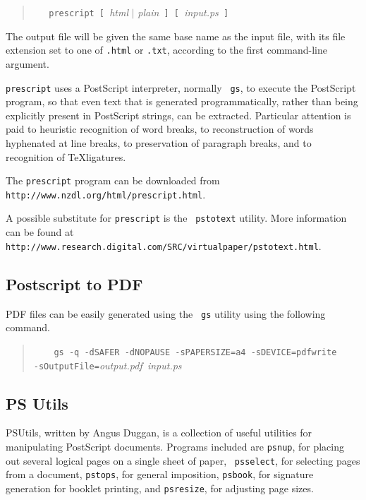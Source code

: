 \documentclass[twoside,11pt]{article}
\newcommand{\htmladdnormallink}[2]{#1}
\newcommand{\htmlref}[2]{#1}
\newcommand{\latex}[1]{#1}
\newcommand{\xlabel}[1]{}
\begin{document}
\begin{quote}
\verb+   prescript [ +{\em html} $\mid$ {\em plain}\verb+ ] [ +{\em input.ps}\verb+ ]+
\end{quote}

The output file will be given the same base name as the input file,
with its file extension set to one of {\tt .html} or {\tt .txt},
according to the first command-line argument. 

{\tt prescript} uses a PostScript interpreter, normally \htmlref{{\tt
gs}}{sc15_gs}, to execute the PostScript program, so that even text
that is generated programmatically, rather than being explicitly
present in PostScript strings, can be extracted. Particular attention
is paid to heuristic recognition of word breaks, to reconstruction of
words hyphenated at line breaks, to preservation of paragraph breaks,
and to recognition of \TeX ligatures. 

The {\tt prescript} program can be downloaded from
\htmladdnormallink{{\tt
http://www.nzdl.org/html/prescript.html}}{http://www.nzdl.org/html/prescript.html}.

A possible substitute for {\tt prescript} is the
\htmladdnormallink{{\tt
pstotext}}{http://www.research.digital.com/SRC/virtualpaper/pstotext.html}
utility. \latex{ More information can be found at {\tt
http://www.research.digital.com/SRC/virtualpaper/pstotext.html}.} 

\subsection{\xlabel{sc15_pstopdf}Postscript to PDF\label{sc15_pstopdf}}

PDF files can be easily generated using the \htmlref{{\tt
gs}}{sc15_gs} utility using the following command.

\begin{quote}
\verb+    gs -q -dSAFER -dNOPAUSE -sPAPERSIZE=a4 -sDEVICE=pdfwrite+\linebreak
\verb+       -sOutputFile=+{\em output.pdf}\verb+ +{\em input.ps}
\end{quote}

\subsection{\xlabel{sc15_pstools}PS Utils\label{sc15_pstools}}

\htmladdnormallink{PSUtils}{http://www.dcs.ed.ac.uk/home/ajcd/psutils/index.html},
written by Angus Duggan, is a collection of useful utilities for
manipulating PostScript documents. Programs included are {\tt psnup},
for placing out several logical pages on a single sheet of paper, {\tt
psselect}, for selecting pages from a document, {\tt pstops}, for
general imposition, {\tt psbook}, for signature generation for booklet
printing, and {\tt psresize}, for adjusting page sizes. 
\end{document}
